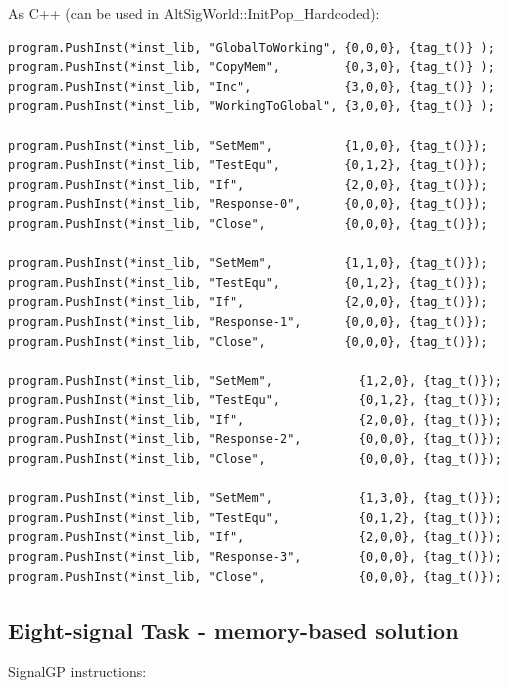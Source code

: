 \documentclass[]{book}
\begin{document}
As C++ (can be used in AltSigWorld::InitPop\_Hardcoded):

\begin{verbatim}
program.PushInst(*inst_lib, "GlobalToWorking", {0,0,0}, {tag_t()} );
program.PushInst(*inst_lib, "CopyMem",         {0,3,0}, {tag_t()} );
program.PushInst(*inst_lib, "Inc",             {3,0,0}, {tag_t()} );
program.PushInst(*inst_lib, "WorkingToGlobal", {3,0,0}, {tag_t()} );

program.PushInst(*inst_lib, "SetMem",          {1,0,0}, {tag_t()});
program.PushInst(*inst_lib, "TestEqu",         {0,1,2}, {tag_t()});
program.PushInst(*inst_lib, "If",              {2,0,0}, {tag_t()});
program.PushInst(*inst_lib, "Response-0",      {0,0,0}, {tag_t()});
program.PushInst(*inst_lib, "Close",           {0,0,0}, {tag_t()});

program.PushInst(*inst_lib, "SetMem",          {1,1,0}, {tag_t()});
program.PushInst(*inst_lib, "TestEqu",         {0,1,2}, {tag_t()});
program.PushInst(*inst_lib, "If",              {2,0,0}, {tag_t()});
program.PushInst(*inst_lib, "Response-1",      {0,0,0}, {tag_t()});
program.PushInst(*inst_lib, "Close",           {0,0,0}, {tag_t()});

program.PushInst(*inst_lib, "SetMem",            {1,2,0}, {tag_t()});
program.PushInst(*inst_lib, "TestEqu",           {0,1,2}, {tag_t()});
program.PushInst(*inst_lib, "If",                {2,0,0}, {tag_t()});
program.PushInst(*inst_lib, "Response-2",        {0,0,0}, {tag_t()});
program.PushInst(*inst_lib, "Close",             {0,0,0}, {tag_t()});

program.PushInst(*inst_lib, "SetMem",            {1,3,0}, {tag_t()});
program.PushInst(*inst_lib, "TestEqu",           {0,1,2}, {tag_t()});
program.PushInst(*inst_lib, "If",                {2,0,0}, {tag_t()});
program.PushInst(*inst_lib, "Response-3",        {0,0,0}, {tag_t()});
program.PushInst(*inst_lib, "Close",             {0,0,0}, {tag_t()});
\end{verbatim}

\hypertarget{eight-signal-task---memory-based-solution}{%
\subsection{Eight-signal Task - memory-based solution}\label{eight-signal-task---memory-based-solution}}

SignalGP instructions:
\end{document}
